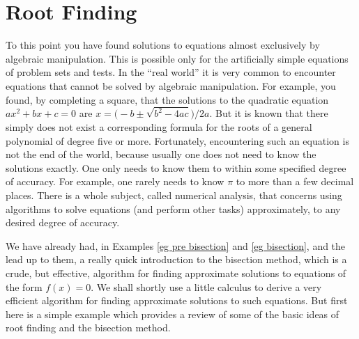 %
%
\graphicspath{{figures/rootFinding/}}
\renewcommand{\theequation}{\thechapter.\arabic{equation}}
\renewcommand{\thetheorem}{\thechapter.\arabic{theorem}}

\chapter{Root Finding}\label{app root finding}

To this point you have found solutions to equations almost
exclusively by algebraic manipulation. This is possible only
for the artificially simple equations of problem sets and
tests. In the ``real world'' it is very common to encounter
equations that cannot be solved by algebraic manipulation.
For example, you found, by completing a square, that the 
solutions to the quadratic equation $ax^2+bx+c=0$ are 
$x=\big(-b\pm\sqrt{b^2-4ac}\big)/2a$.
But it is known that there simply does not exist a corresponding formula
for the roots of a general polynomial of degree five or more.
Fortunately, encountering such an equation is not the end of the
world, because usually one does not need to know the solutions
exactly. One only needs to know them to within some specified 
degree of accuracy. For example, one rarely needs to know $\pi$ 
to more than a few decimal places. There is a whole subject, 
called numerical analysis, that concerns using algorithms to solve 
equations (and perform other tasks) approximately, to any desired 
degree of accuracy. 

We have already had, in Examples \ref{eg pre bisection} and \ref{eg bisection},
and the lead up to them, a really quick introduction to the bisection method, 
which is a crude, but effective, algorithm for finding approximate solutions to equations 
of the form $f(x)=0$. We shall shortly use a little calculus
to derive a very efficient algorithm for finding approximate solutions
to such equations. But first here is a simple
example which provides a review of some of the basic ideas of root
finding and the bisection method.

